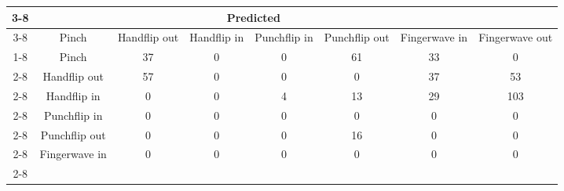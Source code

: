 \documentclass{standalone}
\begin{document}
 
 \begin{tabular}{|c |c |c |c |c |c |c |c |}
\cline{3-8}\multicolumn{2}{c|}{} & \multicolumn{6}{c|}{Predicted} \\ 
\cline{3-8} \multicolumn{2}{c |}{ } & Pinch & Handflip out & Handflip in & Punchflip in & Punchflip out & Fingerwave in & Fingerwave out\\ 
\cline{1-8}\multirow{6}{*}{\rotatebox[origin=c]{90}{Actual}} & Pinch & 37 & 0 & 0 & 61 & 33 & 0\\ 
 \cline{2-8} & Handflip out & 57 & 0 & 0 & 0 & 37 & 53\\ 
 \cline{2-8} & Handflip in & 0 & 0 & 4 & 13 & 29 & 103\\ 
 \cline{2-8} & Punchflip in & 0 & 0 & 0 & 0 & 0 & 0\\ 
 \cline{2-8} & Punchflip out & 0 & 0 & 0 & 16 & 0 & 0\\ 
 \cline{2-8} & Fingerwave in & 0 & 0 & 0 & 0 & 0 & 0\\ 
 \cline{2-8}\hline \end{tabular}
 
\end{document}
